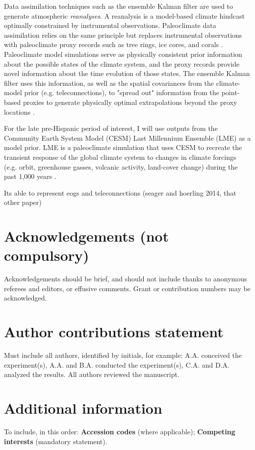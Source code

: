 \documentclass[fleqn,10pt]{wlscirep}
\begin{document}
Data assimilation techniques such as the ensemble Kalman filter are used to generate atmospheric \textit{reanalyses}. A reanalysis is a model-based climate hindcast optimally constrained by instrumental observations. Paleoclimate data assimilation relies on the same principle but replaces instrumental observations with paleoclimate proxy records such as tree rings, ice cores, and corals \cite{Hakim2016TheResults}. Paleoclimate model simulations serve as physically consistent prior information about the possible states of the climate system, and the proxy records provide novel information about the time evolution of those states. The ensemble Kalman filter uses this information, as well as the spatial covariances from the climate-model prior (e.g. teleconnections), to "spread out" information from the point-based proxies to generate physically optimal extrapolations beyond the proxy locations \cite{Acevedo2015TowardsTechniques,Hakim2016TheResults}.

For the late pre-Hispanic period of interest, I will use outputs from the Community Earth System Model (CESM) Last Millennium Ensemble (LME) as a model prior. LME is a paleoclimate simulation that uses CESM to recreate the transient response of the global climate system to changes in climate forcings (e.g. orbit, greenhouse gasses, volcanic activity, land-cover change) during the past 1,000 years \cite{Otto-bliesner2015}.

Its able to represent eogs and teleconnections (seager and hoerling 2014, that other paper)





\section*{Acknowledgements (not compulsory)}

Acknowledgements should be brief, and should not include thanks to anonymous referees and editors, or effusive comments. Grant or contribution numbers may be acknowledged.

\section*{Author contributions statement}

Must include all authors, identified by initials, for example:
A.A. conceived the experiment(s),  A.A. and B.A. conducted the experiment(s), C.A. and D.A. analyzed the results.  All authors reviewed the manuscript. 

\section*{Additional information}

To include, in this order: \textbf{Accession codes} (where applicable); \textbf{Competing interests} (mandatory statement). 
\end{document}
